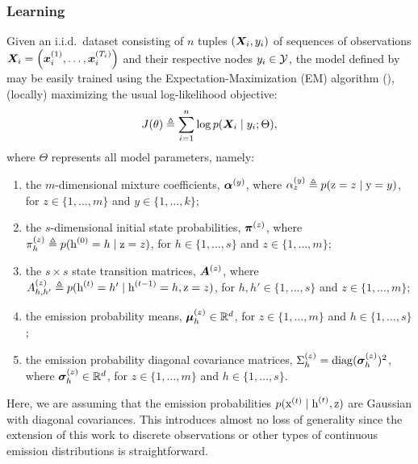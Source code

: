 \subsubsection{Learning}
\label{sec:spamhmm_learning}
Given an i.i.d.\ dataset consisting of $n$ tuples $({\bm{X}}_i, y_i)$ of sequences of observations ${\bm{X}}_i = \left({\bm{x}}_i^{(1)}, \dots,{\bm{x}}_i^{(T_i)} \right)$ and their respective nodes $y_i \in {\mathcal{Y}}$, the model defined by  may be easily trained using the Expectation-Maximization (EM) algorithm (\citet{Dempster1977}), (locally) maximizing the usual log-likelihood objective:
\begin{equation}
\label{eq:spamhmm_log_likelihood}
J(\theta) \triangleq \sum_{i=1}^n \log p({\bm{X}}_i \mid y_i; \Theta),
\end{equation}
where $\Theta$ represents all model parameters, namely:
\begin{enumerate}
	\item the $m$-dimensional mixture coefficients, ${\bm{\alpha}}^{(y)}$, where $ {\alpha}^{(y)}_z \triangleq p({\textnormal{z}}=z \mid {\textnormal{y}}=y)$, for $z \in \{1,\dots,m\}$ and $y \in \{ 1,\dots,k \}$;
	\item the $s$-dimensional initial state probabilities, ${\bm{\pi}}^{(z)}$, where ${\pi}_h^{(z)} \triangleq p({\textnormal{h}}^{(0)}=h \mid {\textnormal{z}}=z)$, for $h \in \{1,\dots,s\}$ and $z \in \{1,\dots,m\}$;
	\item the $s \times s$ state transition matrices, ${\bm{A}}^{(z)}$, where ${A}^{(z)}_{h,h'} \triangleq p({\textnormal{h}}^{(t)}=h' \mid {\textnormal{h}}^{(t-1)}=h, {\textnormal{z}}=z)$, for $h,h' \in \{1,\dots,s\}$ and $z \in \{1,\dots,m\}$;
	\item the emission probability means, ${\bm{\mu}}^{(z)}_h \in \mathbb{R}^d$, for $z \in \{1,\dots,m\}$ and $h \in \{1,\dots,s\}$;
	\item the emission probability diagonal covariance matrices, $\Sigma^{(z)}_h = \mathrm{diag}({\bm{\sigma}}^{(z)}_h)^2$, where ${\bm{\sigma}}^{(z)}_h \in \mathbb{R}^d$, for $z \in \{1,\dots,m\}$ and $h \in \{1,\dots,s\}$.
\end{enumerate}

Here, we are assuming that the emission probabilities $p({\textnormal{x}}^{(t)}\mid{\textnormal{h}}^{(t)},{\textnormal{z}})$ are Gaussian with diagonal covariances. This introduces almost no loss of generality since the extension of this work to discrete observations or other types of continuous emission distributions is straightforward.


